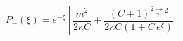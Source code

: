 \begin{equation}\label{15a}
P_-(\xi) = e^{-\xi} \left[ \frac{m^2}{2\kappa
  C}+\frac{(C+1)^2\, \vec{\pi}\,{}^2}{2\kappa C(1 + C\,
  e^\xi)}\right]
\end{equation}


